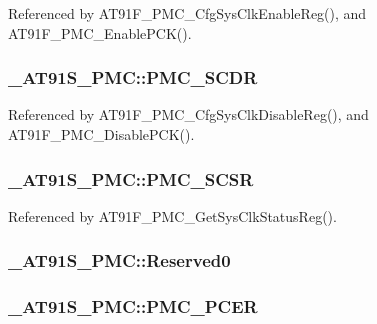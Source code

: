 Referenced by AT91F\_\-PMC\_\-CfgSysClkEnableReg(), and AT91F\_\-PMC\_\-EnablePCK().\hypertarget{struct__AT91S__PMC_528dd78ce6aa4cc56026e2dc7380282d}{
\subsubsection{ {\bf \_\-AT91S\_\-PMC::PMC\_\-SCDR}}}
\label{struct__AT91S__PMC_528dd78ce6aa4cc56026e2dc7380282d}




Referenced by AT91F\_\-PMC\_\-CfgSysClkDisableReg(), and AT91F\_\-PMC\_\-DisablePCK().\hypertarget{struct__AT91S__PMC_b55c9303c8ea02641dc24182c544139e}{
\subsubsection{ {\bf \_\-AT91S\_\-PMC::PMC\_\-SCSR}}}
\label{struct__AT91S__PMC_b55c9303c8ea02641dc24182c544139e}




Referenced by AT91F\_\-PMC\_\-GetSysClkStatusReg().\hypertarget{struct__AT91S__PMC_ae3bfa4a88c29f53b43ad4d6fde4b6ee}{
\subsubsection{ {\bf \_\-AT91S\_\-PMC::Reserved0}}}
\label{struct__AT91S__PMC_ae3bfa4a88c29f53b43ad4d6fde4b6ee}


\hypertarget{struct__AT91S__PMC_bfc7e835740e173465ff67a5957cd371}{
\subsubsection{ {\bf \_\-AT91S\_\-PMC::PMC\_\-PCER}}}
\label{struct__AT91S__PMC_bfc7e835740e173465ff67a5957cd371}




